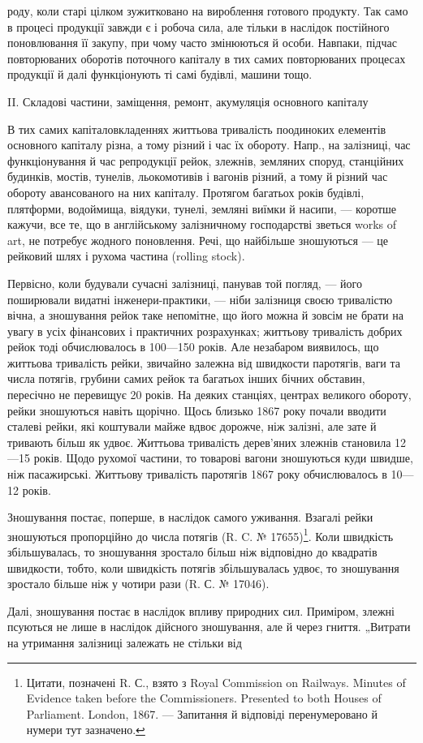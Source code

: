 \parcont{}  %
роду, коли старі цілком зужитковано на вироблення готового продукту. Так само в процесі продукції
завжди є і робоча сила, але тільки в наслідок постійного поновлювання її закупу, при чому часто
змінюються й особи. Навпаки, підчас повторюваних оборотів поточного капіталу в тих самих
повторюваних процесах продукції й далі функціонують ті самі будівлі, машини тощо.

II. Складові частини, заміщення, ремонт, акумуляція основного капіталу

В тих самих капіталовкладеннях життьова тривалість поодиноких елементів основного капіталу різна, а
тому різний і час їх обороту. Напр., на залізниці, час функціонування й час репродукції рейок,
злежнів, земляних споруд, станційних будинків, мостів, тунелів, льокомотивів і вагонів різний, а
тому й різний час обороту авансованого на них капіталу. Протягом багатьох років будівлі, плятформи,
водоймища, віядуки, тунелі,
земляні виїмки й насипи, — коротше кажучи, все те, що в англійському залізничному господарстві
зветься works of art, не потребує жодного поновлення. Речі, що найбільше зношуються — це рейковий
шлях і рухома частина (rolling stock).

Первісно, коли будували сучасні залізниці, панував той погляд, — його поширювали видатні
інженери-практики, — ніби залізниця своєю тривалістю вічна, а зношування рейок таке непомітне, що
його можна й зовсім не брати на увагу в усіх фінансових і практичних розрахунках; життьову
тривалість добрих рейок тоді обчислювалось в 100—150 років. Але незабаром виявилось, що життьова
тривалість рейки, звичайно залежна від швидкости паротягів, ваги та числа потягів, грубини самих
рейок та багатьох інших бічних обставин, пересічно не перевищує 20 років.
На деяких станціях, центрах великого обороту, рейки зношуються навіть щорічно. Щось близько 1867
року почали вводити сталеві рейки, які коштували майже вдвоє дорожче, ніж залізні, але зате й
тривають більш як удвоє. Життьова тривалість дерев’яних злежнів становила 12—15 років. Щодо рухомої
частини, то товарові вагони зношуються куди швидше, ніж пасажирські. Життьову тривалість паротягів
1867 року обчислювалось в 10—12 років.

Зношування постає, поперше, в наслідок самого уживання. Взагалі рейки зношуються пропорційно до
числа потягів (R. C. № 17655)\footnote{
Цитати, позначені R. С., взято з Royal Commission on Railways. Minutes of Evidence taken before
the Commissioners. Presented to both Houses of Parliament. London, 1867. — Запитання й відповіді
перенумеровано й нумери тут зазначено.
}. Коли швидкість збільшувалась, то зношування зростало більш ніж
відповідно до квадратів швидкости, тобто, коли швидкість потягів збільшувалась удвоє, то зношування
зростало більше ніж у чотири рази (R. С. № 17046).

Далі, зношування постає в наслідок впливу природних сил. Приміром, злежні псуються не лише в
наслідок дійсного зношування, але й через гниття. „Витрати на утримання залізниці залежать не
стільки від
\parbreak{}  %
